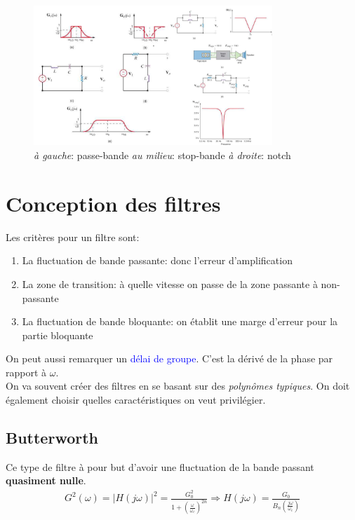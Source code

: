 \documentclass{report}
\begin{document}
\begin{figure}[H]
\centering
\includegraphics[width=9cm]{img/premierOrdre2.png}
\caption{\textit{à gauche}: passe-bande \textit{au milieu}: stop-bande \textit{à droite}: notch}
\end{figure}


\section{Conception des filtres} 
Les critères pour un filtre sont:
\begin{enumerate}
\item La fluctuation de bande passante: donc l'erreur d'amplification
\item La zone de transition: à quelle vitesse on passe de la zone passante à non-passante
\item La fluctuation de bande bloquante: on établit une marge d'erreur pour la partie bloquante
\end{enumerate}
On peut aussi remarquer un \textcolor{blue}{délai de groupe}. C'est la dérivé de la phase par rapport à $\omega$.\\
On va souvent créer des filtres en se basant sur des \textit{polynômes typiques}. On doit également choisir quelles caractéristiques on veut privilégier.

\subsection{Butterworth} \label{But}
Ce type de filtre à pour but d'avoir une fluctuation de la bande passant \textbf{quasiment nulle}.
\begin{align*}
G^2(\omega) = |H(j \omega )|^2 = \frac{G_0^2}{1+(\frac{\omega}{\omega_c})^{2n}} \Rightarrow H(j\omega ) = \frac{G_0}{B_n (\frac{j \omega }{\omega_c })}
\end{align*}
\end{document}
